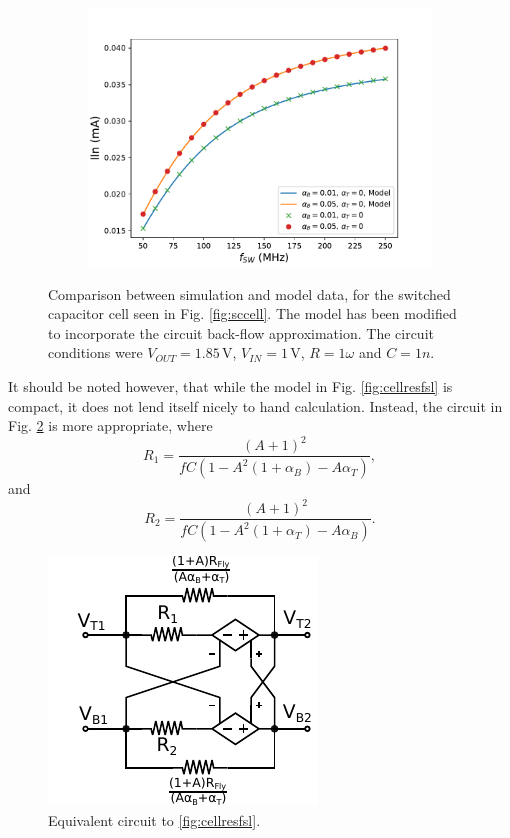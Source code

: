 \begin{figure}
\begin{subfigure}{0.48\linewidth}
		\end{subfigure}
		\begin{subfigure}{0.48\linewidth}
			\includegraphics[width=\linewidth]{4Terminal/Figures/IIN_3_BF.pdf}
		\end{subfigure}
		\caption{Comparison between simulation and model data, for the switched capacitor cell seen in Fig. \ref{fig:sccell}. The model has been modified to incorporate the circuit back-flow approximation. The circuit conditions were $V_{OUT} = 1.85\,$V, $V_{IN} = 1\,$V, $R = 1\omega$ and $C = 1n$.}
		\label{fig:resModelComp2}
	\end{figure}
	
	It should be noted however, that while the model in Fig. \ref{fig:cellresfsl} is compact, it does not lend itself nicely to hand calculation. Instead, the circuit in Fig. \ref{fig:cellresfsl2} is more appropriate, where 
	\begin{equation}
		R_{1} = \frac{(A+1)^2}{fC(1-A^2(1+\alpha_B) - A\alpha_T)},
	\end{equation}
	and
	\begin{equation}
		R_{2} = \frac{(A+1)^2}{fC(1-A^2(1+\alpha_T) - A\alpha_B)}.
	\end{equation}
	\begin{figure}
		\centering
		\includegraphics[width=0.4\linewidth]{4Terminal/Figures/CellRes_FSL_2.pdf}
		\caption{Equivalent circuit to \ref{fig:cellresfsl}.}
		\label{fig:cellresfsl2}
	\end{figure}
	
